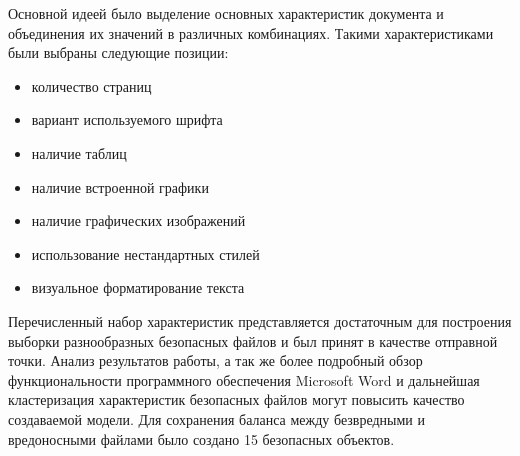 Основной идеей было выделение основных характеристик документа и объединения их значений в различных комбинациях.
Такими характеристиками были выбраны следующие позиции:
\begin{itemize}
\item количество страниц
\item вариант используемого шрифта
\item наличие таблиц
\item наличие встроенной графики
\item наличие графических изображений
\item использование нестандартных стилей
\item визуальное форматирование текста
\end{itemize}

Перечисленный набор характеристик представляется достаточным для построения выборки разнообразных безопасных файлов и был принят в качестве отправной точки.
Анализ результатов работы, а так же более подробный обзор функциональности программного обеспечения Microsoft Word и дальнейшая кластеризация характеристик безопасных файлов могут повысить качество создаваемой модели.
Для сохранения баланса между безвредными и вредоносными файлами было создано 15 безопасных объектов.